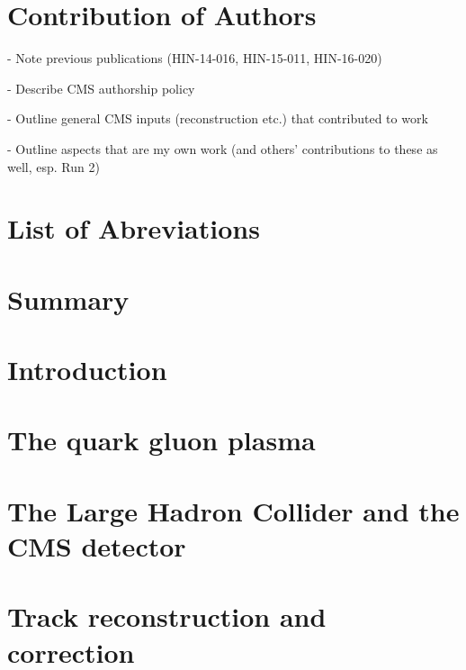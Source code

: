 \documentclass[11pt]{article}
\begin{document}
\section*{Contribution of Authors}

- Note previous publications (HIN-14-016, HIN-15-011, HIN-16-020)

\noindent - Describe CMS authorship policy

\noindent - Outline general CMS inputs (reconstruction etc.) that contributed to work

\noindent - Outline aspects that are my own work (and others' contributions to these as well, esp. Run 2)

\clearpage

\setcounter{tocdepth}{2}
\tableofcontents
\clearpage{}

\listoftables
\clearpage{}

\listoffigures
\clearpage{}

\section*{List of Abreviations}

\clearpage{}

\section*{Summary}

\clearpage{}



\setcounter{page}{1}
\doublespacing


\section{Introduction}
\label{sec:Introduction}

\clearpage

\section{The quark gluon plasma}
\label{sec:Theory}

\clearpage

\section{The Large Hadron Collider and the CMS detector}
\label{sec:Detector}

\clearpage

\section{Track reconstruction and correction}
\label{sec:Tracks}

\clearpage
\end{document}
